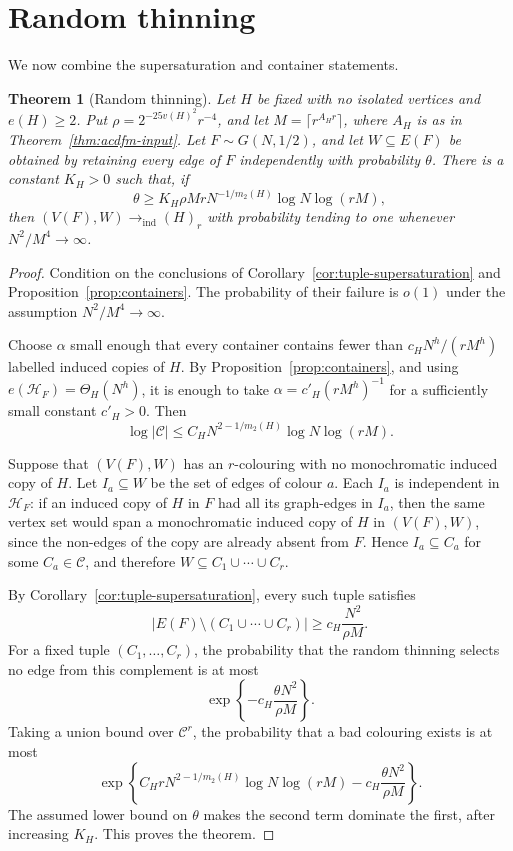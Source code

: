 \documentclass[11pt,reqno]{amsart}
\numberwithin{equation}{section}
\theoremstyle{plain}
\newtheorem{theorem}{Theorem}[section]
\theoremstyle{definition}
\newcommand{\calC}{\mathcal C}
\newcommand{\calH}{\mathcal H}
\newcommand{\ind}{\mathrm{ind}}
\begin{document}
\section{Random thinning}

We now combine the supersaturation and container statements.

\begin{theorem}[Random thinning]
\label{thm:thinning}
Let $H$ be fixed with no isolated vertices and $e(H)\ge2$.  Put $\rho=2^{-25v(H)^2}r^{-4}$,
and let $M=\lceil r^{A_Hr}\rceil$, where $A_H$ is as in
Theorem~\ref{thm:acdfm-input}.  Let $F\sim G(N,1/2)$, and let $W\subseteq E(F)$ be
obtained by retaining every edge of $F$ independently with probability
$\theta$.  There is a constant $K_H>0$ such that, if 
$$
        \theta
        \ge K_H\rho MrN^{-1/m_2(H)}\log N\log(rM),
$$
then $(V(F),W)\longrightarrow_{\ind}(H)_r$ with probability tending to one whenever $N^2/M^4\to\infty$.
\end{theorem}

\begin{proof}
Condition on the conclusions of Corollary~\ref{cor:tuple-supersaturation} and
Proposition~\ref{prop:containers}.  The probability of their failure is
$o(1)$ under the assumption $N^2/M^4\to\infty$.

Choose $\alpha$ small enough that every container contains fewer than
$c_HN^h/(rM^h)$ labelled induced copies of $H$.  By
Proposition~\ref{prop:containers}, and using $e(\calH_F)=\Theta_H(N^h)$, it is enough to
take $\alpha=c'_H(rM^h)^{-1}$ for a sufficiently small constant $c'_H>0$.  Then
$$
        \log |\calC|
        \le C_HN^{2-1/m_2(H)}\log N\log(rM).
$$

Suppose that $(V(F),W)$ has an $r$-colouring with no monochromatic induced
copy of $H$.  Let $I_a\subseteq W$ be the set of edges of colour $a$.
Each $I_a$ is independent in $\calH_F$: if an induced copy of $H$ in
$F$ had all its graph-edges in $I_a$, then the same vertex set would span a
monochromatic induced copy of $H$ in $(V(F),W)$, since the non-edges of the
copy are already absent from $F$.  Hence $I_a\subseteq C_a$ for some
$C_a\in\calC$, and therefore $W\subseteq C_1\cup\cdots\cup C_r$.

By Corollary~\ref{cor:tuple-supersaturation}, every such tuple satisfies
$$
        |E(F)\setminus(C_1\cup\cdots\cup C_r)|
        \ge c_H\frac{N^2}{\rho M}.
$$
For a fixed tuple $(C_1,\ldots,C_r)$, the probability that the random
thinning selects no edge from this complement is at most
$$
        \exp\left\{-c_H\frac{\theta N^2}{\rho M}\right\}.
$$
Taking a union bound over $\calC^r$, the probability that a bad colouring
exists is at most
$$
        \exp\left\{
        C_HrN^{2-1/m_2(H)}\log N\log(rM)
        -c_H\frac{\theta N^2}{\rho M}
        \right\}.
$$
The assumed lower bound on $\theta$ makes the second term dominate the first,
after increasing $K_H$.  This proves the theorem.
\end{proof}
\end{document}
